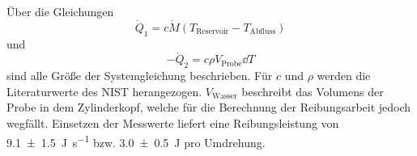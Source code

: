	Über die Gleichungen
	\begin{equation} %
		\dot{Q}_1 = c \dot{M} (T_\text{Reservoir} - T_\text{Abfluss})
	\end{equation} %
	und
	\begin{equation} \label{eq:Q2} %
		-\dot{Q}_2 = c \rho V_\text{Probe} \dd{T}
	\end{equation} %
	sind alle Größe der Systemgleichung beschrieben.
	Für $c$ und $\rho$ werden die Literaturwerte des NIST\cite{NISTwater} herangezogen.
	$V_\text{Wasser}$ beschreibt das Volumens der Probe in dem Zylinderkopf, welche für die Berechnung der Reibungsarbeit jedoch wegfällt.
	Einsetzen der Messwerte liefert eine Reibungsleistung von \SI{9.1+-1.5}{\joule\per\second} bzw. \SI{3.0+-0.5}{\joule} pro Umdrehung.	
	
